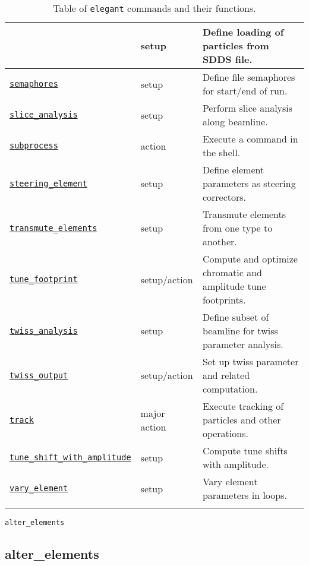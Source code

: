 \documentclass[11pt]{article}
\begin{document}
\begin{longtable}{|p{2.75in}|p{0.75in}|p{2.75in}|}
{\hyperref[subsec:sddsbeam]{\tt sdds\_beam} & setup & Define loading of particles from SDDS file. \\ \hline
\hyperref[subsec:semaphores]{\tt semaphores} & setup & Define file semaphores for start/end of run. \\ \hline
\hyperref[subsec:sliceanalysis]{\tt slice\_analysis} & setup & Perform slice analysis along beamline. \\ \hline
\hyperref[subsec:subprocess]{\tt subprocess} & action & Execute a command in the shell. \\ \hline
\hyperref[subsec:steeringelement]{\tt steering\_element} & setup & Define element parameters as steering correctors. \\ \hline
\hyperref[subsec:transmuteelements]{\tt transmute\_elements} & setup & Transmute elements from one type to another. \\ \hline
\hyperref[subsec:tunefootprint]{\tt tune\_footprint} & setup/action & Compute and optimize chromatic and amplitude tune footprints. \\ \hline
\hyperref[subsec:twissanalysis]{\tt twiss\_analysis} & setup & Define subset of beamline for twiss parameter analysis. \\ \hline
\hyperref[subsec:twissoutput]{\tt twiss\_output} & setup/action & Set up twiss parameter and related computation. \\ \hline
\hyperref[subsec:track]{\tt track} & major action & Execute tracking of particles and other operations. \\ \hline
\hyperref[subsec:tuneshiftwithamplitude]{\tt tune\_shift\_with\_amplitude} & setup & Compute tune shifts with amplitude. \\ \hline
\hyperref[subsec:varyelement]{\tt vary\_element} & setup & Vary element parameters in loops. \\ \hline
\caption{Table of {\tt elegant} commands and their functions.}
\end{longtable}

\clearpage

\newpage
\begin{center}{\Large\verb|alter_elements|}\end{center}
\subsection{alter\_elements\label{subsec:alterelements}}
\end{document}
